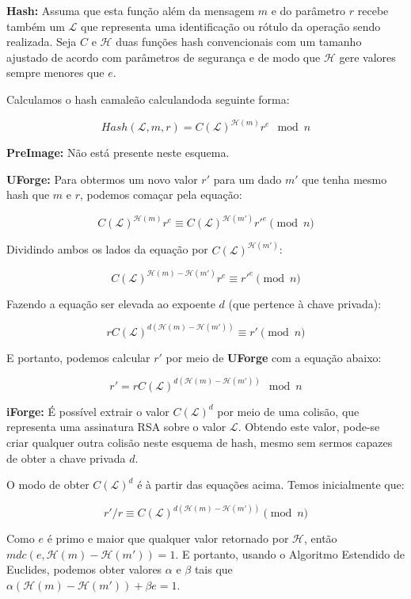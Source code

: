 \documentclass[a4paper]{article}
\begin{document}
\textbf{Hash: } Assuma que esta função além da mensagem $m$ e do
parâmetro $r$ recebe também um $\mathcal{L}$ que representa uma
identificação ou rótulo da operação sendo realizada. Seja $C$ e
$\mathcal{H}$ duas funções hash convencionais com um tamanho ajustado
de acordo com parâmetros de segurança e de modo que $\mathcal{H}$ gere
valores sempre menores que $e$.

Calculamos o hash camaleão calculandoda seguinte forma:

$$
Hash(\mathcal{L}, m, r) = C(\mathcal{L})^{\mathcal{H}(m)}r^e \mod n
$$

\textbf{PreImage:} Não está presente neste esquema.

\textbf{UForge:} Para obtermos um novo valor $r'$ para um dado $m'$
que tenha mesmo hash que $m$ e $r$, podemos comaçar pela equação:

$$
C(\mathcal{L})^{\mathcal{H}(m)}r^e \equiv C(\mathcal{L})^{\mathcal{H}(m')}r'^e \pmod n
$$

Dividindo ambos os lados da equação por $C(\mathcal{L})^{\mathcal{H}(m')}$:

$$
C(\mathcal{L})^{\mathcal{H}(m)-\mathcal{H}(m')}r^e \equiv r'^e \pmod n
$$

Fazendo a equação ser elevada ao expoente $d$ (que pertence à chave
privada):

$$
rC(\mathcal{L})^{d(\mathcal{H}(m)-\mathcal{H}(m'))} \equiv r' \pmod n
$$

E portanto, podemos calcular $r'$ por meio de \textbf{UForge} com a
equação abaixo:

$$
r' = rC(\mathcal{L})^{d(\mathcal{H}(m)-\mathcal{H}(m'))} \mod n
$$

\textbf{iForge:} É possível extrair o valor $C(\mathcal{L})^d$ por
meio de uma colisão, que representa uma assinatura RSA sobre o valor
$\mathcal{L}$. Obtendo este valor, pode-se criar qualquer outra
colisão neste esquema de hash, mesmo sem sermos capazes de obter a
chave privada $d$.

O modo de obter $C(\mathcal{L})^d$ é à partir das equações
acima. Temos inicialmente que:

$$
r'/r \equiv C(\mathcal{L})^{d(\mathcal{H}(m)-\mathcal{H}(m'))} \pmod n
$$

Como $e$ é primo e maior que qualquer valor retornado por
$\mathcal{H}$, então $mdc(e, \mathcal{H}(m)-\mathcal{H}(m')) = 1$. E
portanto, usando o Algoritmo Estendido de Euclides, podemos obter
valores $\alpha$ e $\beta$ tais que
$\alpha(\mathcal{H}(m)-\mathcal{H}(m'))+\beta e = 1$.
\end{document}
